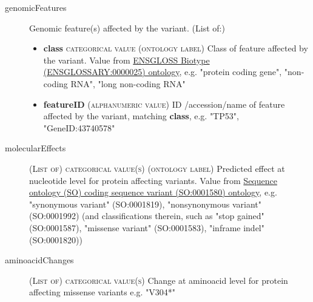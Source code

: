 \documentclass[a4paper, 10pt]{article}        %
\begin{document}
\begin{description}
	\item[genomicFeatures] Genomic feature(s) affected by the variant. (List of:)
	\begin{itemize}
			\item[]  \textbf{class} {\textsc{categorical value (ontology label)}} Class of feature affected by the variant. Value from \href{http://ensembl.org/glossary/ENSGLOSSARY_0000025}{ENSGLOSS Biotype (ENSGLOSSARY:0000025) ontology}, e.g. "protein coding gene", "non-coding RNA", "long non-coding RNA"
			\item[]  \textbf{featureID} {\textsc{(alphanumeric value)}} ID /accession/name of feature affected by the variant, matching \textbf{class}, e.g. "TP53", "GeneID:43740578"
	\end{itemize} 
	\item[molecularEffects] {\textsc{(List of) categorical value(s) (ontology label)}} Predicted effect at nucleotide level for protein affecting variants. Value from \href{http://purl.obolibrary.org/obo/SO_0001580}{Sequence ontology (SO) coding sequence variant (SO:0001580) ontology}, e.g. "synonymous variant" (SO:0001819), "nonsynonymous variant" (SO:0001992) (and classifications therein, such as "stop gained" (SO:0001587), "missense variant" (SO:0001583), "inframe indel" (SO:0001820))
	\item[aminoacidChanges]  {\textsc{(List of) categorical value(s)}} Change at aminoacid level for protein affecting missense variants e.g. "V304*"
	
 \end{description}



\end{document}
